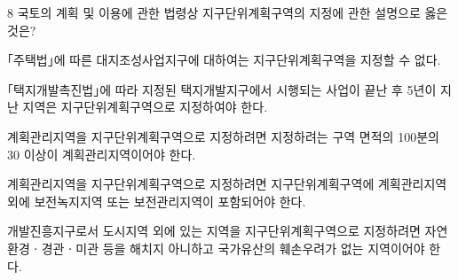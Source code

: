 \begin{question}{8}
국토의 계획 및 이용에 관한 법령상 지구단위계획구역의 지정에 관한 설명으로 옳은 것은?
\begin{choices}
  \item ｢주택법｣에 따른 대지조성사업지구에 대하여는 지구단위계획구역을 지정할 수 없다.
  \item ｢택지개발촉진법｣에 따라 지정된 택지개발지구에서 시행되는 사업이 끝난 후 5년이 지난 지역은 지구단위계획구역으로 지정하여야 한다.
  \item 계획관리지역을 지구단위계획구역으로 지정하려면 지정하려는 구역 면적의 100분의 30 이상이 계획관리지역이어야 한다.
  \item 계획관리지역을 지구단위계획구역으로 지정하려면 지구단위계획구역에 계획관리지역 외에 보전녹지지역 또는 보전관리지역이 포함되어야 한다.
  \item 개발진흥지구로서 도시지역 외에 있는 지역을 지구단위계획구역으로 지정하려면 자연환경ㆍ경관ㆍ미관 등을 해치지 아니하고 국가유산의 훼손우려가 없는 지역이어야 한다.
\end{choices}
\end{question}
